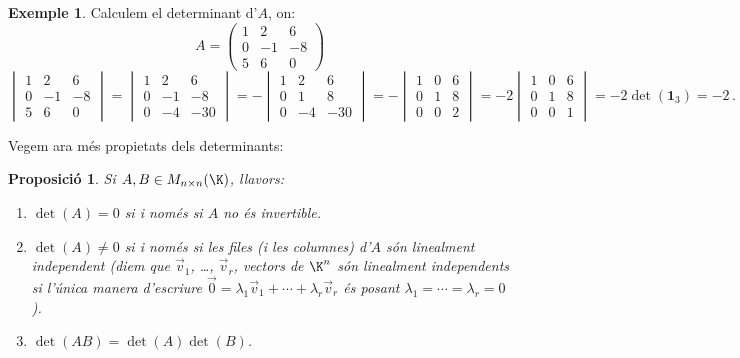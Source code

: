 \documentclass[a4paper,12pt,twoside]{article}
\newcommand{\1}{\mathbf{1}}
\newcommand{\0}{\mathbf{0}}
\newtheorem{proposicio}[teorema]{Proposició}
\theoremstyle{definition}
\newtheorem{exemple}[teorema]{Exemple}
\theoremstyle{remark}
\begin{document}
\begin{exemple}
	Calculem el determinant d'$A$, on:$$
	A=\begin{pmatrix}
	1 & 2 & 6 \\ 0 & -1 & -8 \\ 5 & 6 & 0
	\end{pmatrix}
	$$
	$$
	\begin{vmatrix}
	1 & 2 & 6 \\ 0 & -1 & -8 \\ 5 & 6 & 0
	\end{vmatrix}=
	\begin{vmatrix}
	1 & 2 & 6 \\ 0 & -1 & -8 \\ 0 & -4 & -30
	\end{vmatrix}=
	-\begin{vmatrix}
	1 & 2 & 6 \\ 0 & 1 & 8 \\ 0 & -4 & -30
	\end{vmatrix}=
	-\begin{vmatrix}
	1 & 0 & 6 \\ 0 & 1 & 8 \\ 0 & 0 & 2
	\end{vmatrix}=
	-2\begin{vmatrix}
	1 & 0 & 6 \\ 0 & 1 & 8 \\ 0 & 0 & 1
	\end{vmatrix}= -2 \det(\1_3)=-2\,.
	$$
\end{exemple}
Vegem ara més propietats dels determinants:
\begin{proposicio}
	Si $A, B\in M_{n\times n}(\K)$, llavors:
	\begin{enumerate}[\rm (a)]
		\item $\det(A)=0$ si i només si $A$ no és invertible.
		\item $\det(A)\neq 0$ si i només si les files (i les columnes) d'$A$ són linealment independent (diem que $\vec{v}_1$, \ldots, $\vec{v}_r$, vectors de $\K^n$ són \emph{linealment independents} si l'única manera d'escriure $\vec{0}=\lambda_1 \vec{v}_1 + \cdots + \lambda_r\vec{v}_r$ és posant $\lambda_1=\cdots=\lambda_r=0$).
		\item $\det(AB)=\det(A)\det(B)$.
	\end{enumerate}
\end{proposicio}
\end{document}
